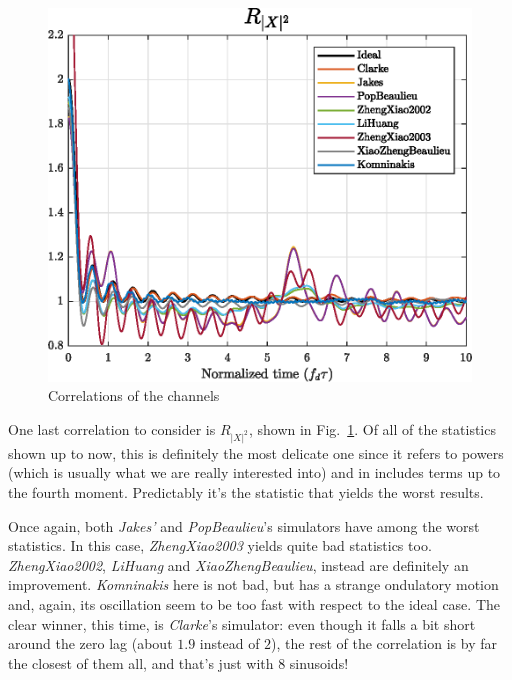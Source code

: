 \begin{figure}
	\centering
	\begin{minipage}{\linewidth}
		\includegraphics[width=\linewidth]{img/X2.eps}
	\end{minipage}
	
	\caption{Correlations of the channels}
	\label{fig:R_X2}
\end{figure}

One last correlation to consider is $R_{|X|^2}$, shown in Fig.~\ref{fig:R_X2}. Of all of the statistics shown up to now, this is definitely the most delicate one since it refers to powers (which is usually what we are really interested into) and in includes terms up to the fourth moment. Predictably it's the statistic that yields the worst results.

Once again, both \textit{Jakes'} and \textit{PopBeaulieu}'s simulators have among the worst statistics. In this case, \textit{ZhengXiao2003} yields quite bad statistics too. \textit{ZhengXiao2002}, \textit{LiHuang} and \textit{XiaoZhengBeaulieu}, instead are definitely an improvement. \textit{Komninakis} here is not bad, but has a strange ondulatory motion and, again, its oscillation seem to be too fast with respect to the ideal case. The clear winner, this time, is \textit{Clarke}'s simulator: even though it falls a bit short around the zero lag (about $1.9$ instead of $2$), the rest of the correlation is by far the closest of them all, and that's just with $8$ sinusoids!

